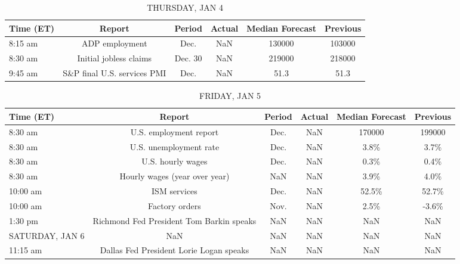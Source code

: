 \documentclass{article}%
\begin{document}
%


\begin{table}[htbp]%
\caption{THURSDAY, JAN 4}%
\centering%
\begin{adjustbox}{width=1\textwidth}%
\begin{tabular}{lccccc}
\toprule
Time (ET) &                      Report &  Period & Actual & Median Forecast & Previous \\
\midrule
  8:15 am &              ADP employment &    Dec. &    NaN &          130000 &   103000 \\
  8:30 am &      Initial jobless claims & Dec. 30 &    NaN &          219000 &   218000 \\
  9:45 am & S\&P final U.S. services PMI &    Dec. &    NaN &            51.3 &     51.3 \\
\bottomrule
\end{tabular}
%
\end{adjustbox}%
\end{table}

%


\begin{table}[htbp]%
\caption{FRIDAY, JAN 5}%
\centering%
\begin{adjustbox}{width=1\textwidth}%
\begin{tabular}{lccccc}
\toprule
      Time (ET) &                                   Report & Period & Actual & Median Forecast & Previous \\
\midrule
        8:30 am &                   U.S. employment report &   Dec. &    NaN &          170000 &   199000 \\
        8:30 am &                   U.S. unemployment rate &   Dec. &    NaN &            3.8\% &     3.7\% \\
        8:30 am &                        U.S. hourly wages &   Dec. &    NaN &            0.3\% &     0.4\% \\
        8:30 am &            Hourly wages (year over year) &    NaN &    NaN &            3.9\% &     4.0\% \\
       10:00 am &                             ISM services &   Dec. &    NaN &           52.5\% &    52.7\% \\
       10:00 am &                           Factory orders &   Nov. &    NaN &            2.5\% &    -3.6\% \\
        1:30 pm & Richmond Fed President Tom Barkin speaks &    NaN &    NaN &             NaN &      NaN \\
SATURDAY, JAN 6 &                                      NaN &    NaN &    NaN &             NaN &      NaN \\
       11:15 am &  Dallas Fed President Lorie Logan speaks &    NaN &    NaN &             NaN &      NaN \\
\bottomrule
\end{tabular}
%
\end{adjustbox}%
\end{table}
\end{document}
